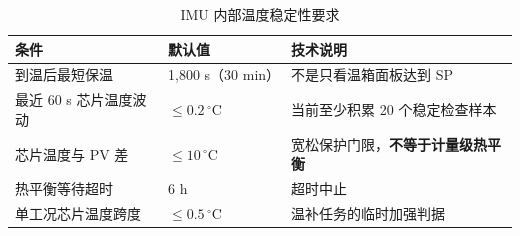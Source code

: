 \begin{table}[H]\centering\small
\caption{IMU 内部温度稳定性要求}
\noindent\begin{tabularx}{\linewidth}{@{}Yp{38mm}Y@{}}\toprule
条件 & 默认值 & 技术说明\\\midrule
到温后最短保温 & 1,800 s（30 min） & 不是只看温箱面板达到 SP\\
最近 60 s 芯片温度波动 & $\le0.2\, ^\circ\mathrm C$ & 当前至少积累 20 个稳定检查样本\\
芯片温度与 PV 差 & $\le10\, ^\circ\mathrm C$ & 宽松保护门限，\textbf{不等于计量级热平衡}\\
热平衡等待超时 & 6 h & 超时中止\\
单工况芯片温度跨度 & $\le0.5\, ^\circ\mathrm C$ & 温补任务的临时加强判据\\\bottomrule\end{tabularx}\end{table}
